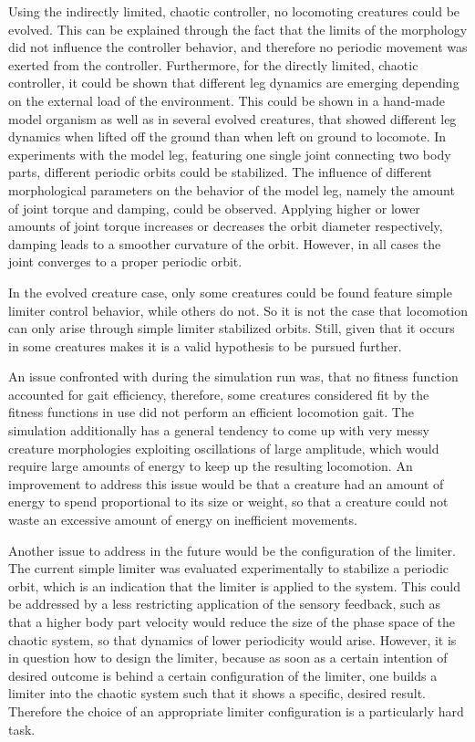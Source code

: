 \documentclass[main]{subfiles}
\begin{document}
%
Using the indirectly limited, chaotic controller, no locomoting creatures could be evolved. %
%
This can be explained through the fact that the limits of the morphology did not influence the controller behavior, and therefore no periodic movement was exerted from the controller. %
%
Furthermore, for the directly limited, chaotic controller, it could be shown that different leg dynamics are emerging depending on the external load of the environment. %
%
This could be shown in a hand-made model organism as well as in several evolved creatures, that showed different leg dynamics when lifted off the ground than when left on ground to locomote. %
%
In experiments with the model leg, featuring one single joint connecting two body parts, different periodic orbits could be stabilized. 
%
The influence of different morphological parameters on the behavior of the model leg, namely the amount of joint torque and damping, could be observed. %
%
Applying higher or lower amounts of joint torque increases or decreases the orbit diameter respectively, damping leads to a smoother curvature of the orbit. %
%
However, in all cases the joint converges to a proper periodic orbit.

In the evolved creature case, only some creatures could be found feature simple limiter control behavior, while others do not. %
%
So it is not the case that locomotion can only arise through simple limiter stabilized orbits. %
%
Still, given that it occurs in some creatures makes it is a valid hypothesis to be pursued further.

An issue confronted with during the simulation run was, that no fitness function accounted for gait efficiency, therefore, some creatures considered fit by the fitness functions in use did not perform an efficient locomotion gait. %
%
The simulation additionally has a general tendency to come up with very messy creature morphologies exploiting oscillations of large amplitude, which would require large amounts of energy to keep up the resulting locomotion. %
%
An improvement to address this issue would be that a creature had an amount of energy to spend proportional to its size or weight, so that a creature could not waste an excessive amount of energy on inefficient movements. 

Another issue to address in the future would be the configuration of the limiter. %
%
The current simple limiter was evaluated experimentally to stabilize a periodic orbit, which is an indication that the limiter is applied to the system. %
%
This could be addressed by a less restricting application of the sensory feedback, such as that a higher body part velocity would reduce the size of the phase space of the chaotic system, so that dynamics of lower periodicity would arise. %
%
However, it is in question how to design the limiter, because as soon as a certain intention of desired outcome is behind a certain configuration of the limiter, one builds a limiter into the chaotic system such that it shows a specific, desired result. %
%
Therefore the choice of an appropriate limiter configuration is a particularly hard task. 
\end{document}
